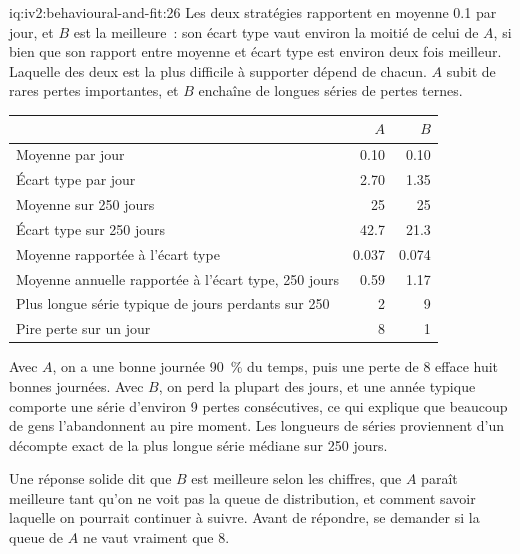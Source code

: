 \begin{solution}{iq:iv2:behavioural-and-fit:26}
Les deux stratégies rapportent en moyenne 0.1 par jour, et $B$ est la meilleure~: son écart type vaut environ la moitié de celui de $A$, si bien que son rapport entre moyenne et écart type est environ deux fois meilleur. Laquelle des deux est la plus difficile à supporter dépend de chacun. $A$ subit de rares pertes importantes, et $B$ enchaîne de longues séries de pertes ternes.

\begin{center}\small
\begin{tabular}{@{}lrr@{}}
 & $A$ & $B$ \\ \hline
Moyenne par jour & 0.10 & 0.10 \\
Écart type par jour & 2.70 & 1.35 \\
Moyenne sur 250 jours & 25 & 25 \\
Écart type sur 250 jours & 42.7 & 21.3 \\
Moyenne rapportée à l'écart type & 0.037 & 0.074 \\
Moyenne annuelle rapportée à l'écart type, 250 jours & 0.59 & 1.17 \\
Plus longue série typique de jours perdants sur 250 & 2 & 9 \\
Pire perte sur un jour & 8 & 1
\end{tabular}
\end{center}
Avec $A$, on a une bonne journée 90~\% du temps, puis une perte de 8 efface huit bonnes journées. Avec $B$, on perd la plupart des jours, et une année typique comporte une série d'environ 9 pertes consécutives, ce qui explique que beaucoup de gens l'abandonnent au pire moment. Les longueurs de séries proviennent d'un décompte exact de la plus longue série médiane sur 250 jours.

Une réponse solide dit que $B$ est meilleure selon les chiffres, que $A$ paraît meilleure tant qu'on ne voit pas la queue de distribution, et comment savoir laquelle on pourrait continuer à suivre. Avant de répondre, se demander si la queue de $A$ ne vaut vraiment que 8.

\end{solution}

